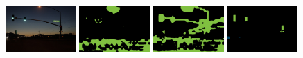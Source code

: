\begin{figure}[p!]
  {\includegraphics[width=0.24\textwidth, height=1.8cm]{figures/experiments/coco/image/0089.jpg}}
  {\includegraphics[width=0.24\textwidth, height=1.8cm]{figures/experiments/coco/orgckpt/0089.png}}
  {\includegraphics[width=0.24\textwidth, height=1.8cm]{figures/experiments/coco/nonnoisy/0089.png}}
  {\includegraphics[width=0.24\textwidth, height=1.8cm]{figures/experiments/coco/gt/000000008762_instanceTrainIds.png}}
  

\end{figure}
